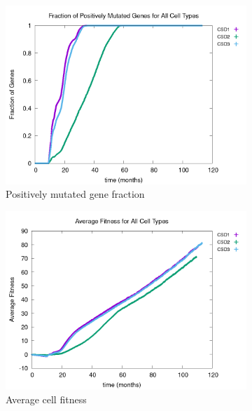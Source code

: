 \documentclass[\main/thesis.tex]{subfiles}
\begin{document}
\begin{figure}[H]
    \centering
    \begin{subfigure}[t]{.49\textwidth}
      \centering
      \includegraphics[width=\textwidth]{images/4_CarcinFunc/Fig5/numPosMut_CarcinFuncs.png}
      \caption{Positively mutated gene fraction}
      \label{fig:CarcinFunc_numPosMut}
    \end{subfigure}
    \begin{subfigure}[t]{.49\textwidth}
      \centering
      \includegraphics[width=\textwidth]{images/4_CarcinFunc/Fig5/fitness_CarcinFuncs.png}
      \caption{Average cell fitness}
      \label{fig:CarcinFunc_fitness}
    \end{subfigure}
    \begin{subfigure}[t]{.49\textwidth}

\end{subfigure}
\end{figure}
\end{document}
